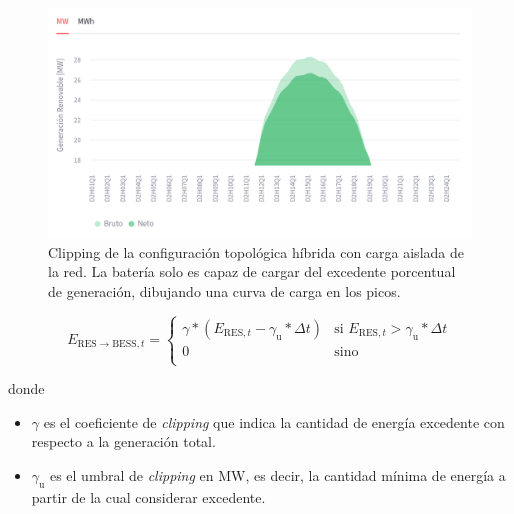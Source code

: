 \begin{figure}
  \centering
  \includegraphics[width=0.75\linewidth]{figures/clipping.png}
  \caption[Clipping de configuración topológica híbrida.]{Clipping de la configuración topológica híbrida con carga aislada de la red. La batería solo es capaz de cargar del excedente porcentual de generación, dibujando una curva de carga en los picos.}%
  \label{fig:clipping}
\end{figure}

\begin{samepage}

  \begin{equation}%
    \label{eq:clipping}
    E_{\mathrm{RES} \rightarrow \mathrm{BESS}, t} =
    \begin{cases}
      \gamma * \left(E_{\mathrm{RES}, t} - \gamma_{\mathrm{u}} * \Delta t\right) & \text{si } E_{\mathrm{RES}, t} > \gamma_{\mathrm{u}} * \Delta t \\
      0                                                                          & \text{sino}                                                     \\
    \end{cases}
  \end{equation}

  donde

  \begin{itemize}

    \item \( \gamma \) es el coeficiente de \textit{clipping} que indica la cantidad de energía excedente con respecto a la generación total.

    \item \( \gamma_{\mathrm{u}} \) es el umbral de \textit{clipping} en \si{\mega\watt}, es decir, la cantidad mínima de energía a partir de la cual considerar excedente.

  \end{itemize}

\end{samepage}


